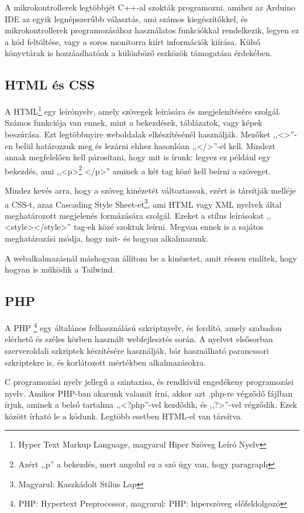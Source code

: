 \documentclass[
]{thesis-ekf}
\theoremstyle{definition}
\theoremstyle{remark}
\begin{document}
	A mikrokontrollerek legtöbbjét C++-al szokták programozni, amihez az Arduino IDE az egyik legnépszerűbb választás, ami számos kiegészítőkkel, és mikrokontrollerek programozásához használatos funkciókkal rendelkezik, legyen ez a kód feltöltése, vagy a soros monitorra kiírt információk kiírása. Külső könyvtárak is hozzáadhatóak a különböző eszközök támogatása érdekében. 
	
	\subsection{HTML és CSS}
	A HTML\footnote{Hyper Text Markup Language, magyarul Hiper Szöveg Leíró Nyelv}  egy leírónyelv, amely szövegek leírására és megjelenítésére szolgál. Számos funkciója van ennek, mint a bekezdések, táblázatok, vagy képek beszúrása. Ezt legtöbbnyire weboldalak elkészítésénél használják. Mezőket ,,<>''-en belül határozzuk meg és lezárni ehhez hasonlóan ,,</>''-el kell. Mindezt annak megfelelően kell párosítani, hogy mit is írunk: legyez ez például egy bekezdés, ami ,,<p>\footnote{Azért ,,p'' a bekezdés, mert angolul ez a szó úgy van, hogy paragraph} </p>'' aminek a két tag közé kell beírni a szöveget.
	
	Mindez kevés arra, hogy a szöveg kinézetét változtassuk, ezért is társítják melléje a CSS-t, azaz Cascading Style Sheet-et\footnote{Magyarul: Kaszkádolt Stílus Lap}, ami HTML vagy XML nyelvek által meghatározott megjelenés formázására szolgál. Ezeket a stílus leírásokat ,,<style></style>'' tag-ek közé szoktuk leírni. Megvan ennek is a sajátos meghatározási módja, hogy mit- és hogyan alkalmazunk.
	
	A webalkalmazásnál máshogyan állítom be a kinézetet, amit  részen említek, hogy hogyan is működik a Tailwind.
	
	\subsection{PHP}
	A PHP \footnote{PHP: Hypertext Preprocessor, magyarul: PHP: hiperszöveg előfeldolgozó} egy általános felhasználású szkriptnyelv, és fordító, amely szabadon elérhető és széles körben használt webfejlesztés során. A nyelvet elsősorban szerveroldali szkriptek készítésére használják, bár használható parancssori szkriptekre is, és korlátozott mértékben alkalmazásokra.\cite{php}
	
	C programozási nyelv jellegű a szintaxisa, és rendkívül engedékeny programozási nyelv. Amikor PHP-ban akarunk valamit írni, akkor azt .php-re végződő fájlban írjuk, aminek a belső tartalma ,,<?php''-vel kezdődik, és ,,?>''-vel végződik. Ezek között írható le a kódunk. Legtöbb esetben HTML-el van társítva.
	
\end{document}
